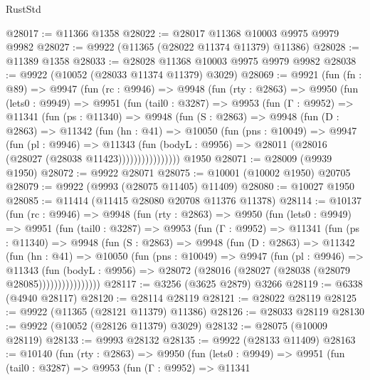 \begin{lexlean}{RustStd}
\begin{coremodule}
@28017 := @11366 @1358
@28022 := @28017 @11368 @10003 @9975 @9979 @9982
@28027 := @9922 (@11365 (@28022 @11374 @11379) @11386)
@28028 := @11389 @1358
@28033 := @28028 @11368 @10003 @9975 @9979 @9982
@28038 := @9922 (@10052 (@28033 @11374 @11379) @3029)
@28069 := @9921
    (fun (fn : @89) =>
    @9947
      (fun (rc : @9946) =>
      @9948
        (fun (rty : @2863) =>
        @9950
          (fun (lets0 : @9949) =>
          @9951
            (fun (tail0 : @3287) =>
            @9953
              (fun (Γ : @9952) =>
              @11341
                (fun (ps : @11340) =>
                @9948
                  (fun (S : @2863) =>
                  @9948
                    (fun (D : @2863) =>
                    @11342
                      (fun (hn : @41) =>
                      @10050
                        (fun (pns : @10049) =>
                        @9947
                          (fun (pl : @9946) =>
                          @11343
                            (fun (bodyL : @9956) =>
                            @28011 (@28016 (@28027 (@28038 @11423))))))))))))))))
    @1950
@28071 := @28009 (@9939 @1950)
@28072 := @9922 @28071
@28075 := @10001 (@10002 @1950) @20705
@28079 := @9922 (@9993 (@28075 @11405) @11409)
@28080 := @10027 @1950
@28085 := @11414 (@11415 @28080 @20708 @11376 @11378)
@28114 := @10137
    (fun (rc : @9946) =>
    @9948
      (fun (rty : @2863) =>
      @9950
        (fun (lets0 : @9949) =>
        @9951
          (fun (tail0 : @3287) =>
          @9953
            (fun (Γ : @9952) =>
            @11341
              (fun (ps : @11340) =>
              @9948
                (fun (S : @2863) =>
                @9948
                  (fun (D : @2863) =>
                  @11342
                    (fun (hn : @41) =>
                    @10050
                      (fun (pns : @10049) =>
                      @9947
                        (fun (pl : @9946) =>
                        @11343
                          (fun (bodyL : @9956) =>
                          @28072 (@28016 (@28027 (@28038 (@28079 @28085))))))))))))))))
@28117 := @3256 (@3625 @2879) @3266
@28119 := @6338 (@4940 @28117)
@28120 := @28114 @28119
@28121 := @28022 @28119
@28125 := @9922 (@11365 (@28121 @11379) @11386)
@28126 := @28033 @28119
@28130 := @9922 (@10052 (@28126 @11379) @3029)
@28132 := @28075 (@10009 @28119)
@28133 := @9993 @28132
@28135 := @9922 (@28133 @11409)
@28163 := @10140
    (fun (rty : @2863) =>
    @9950
      (fun (lets0 : @9949) =>
      @9951
        (fun (tail0 : @3287) =>
        @9953
          (fun (Γ : @9952) =>
          @11341

\end{coremodule}
\end{lexlean}
